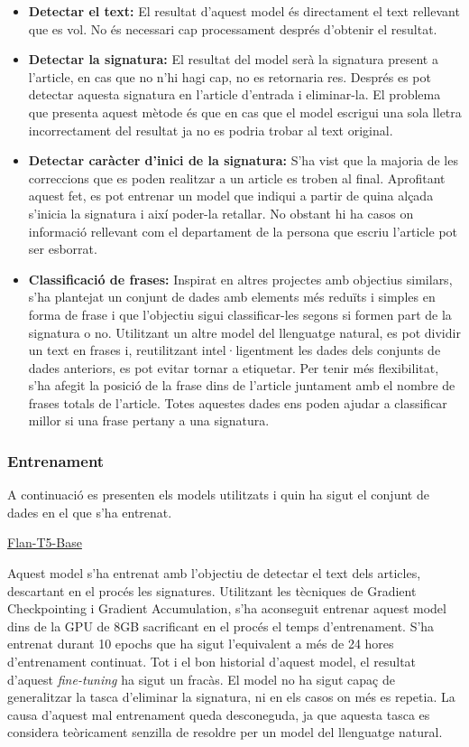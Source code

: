 \begin{itemize}
     \item \textbf{Detectar el text:} El resultat d'aquest model és directament el text rellevant que es vol. No és necessari cap processament després d'obtenir el resultat.
     \item \textbf{Detectar la signatura:} El resultat del model serà la signatura present a l'article, en cas que no n'hi hagi cap, no es retornaria res. Després es pot detectar aquesta signatura en l'article d'entrada i eliminar-la. El problema que presenta aquest mètode és que en cas que el model escrigui una sola lletra incorrectament del resultat ja no es podria trobar al text original.
     \item \textbf{Detectar caràcter d'inici de la signatura:} S'ha vist que la majoria de les correccions que es poden realitzar a un article es troben al final. Aprofitant aquest fet, es pot entrenar un model que indiqui a partir de quina alçada s'inicia la signatura i així poder-la retallar. No obstant hi ha casos on informació rellevant com el departament de la persona que escriu l'article pot ser esborrat.
     \item \textbf{Classificació de frases:} Inspirat en altres projectes amb objectius similars, s'ha plantejat un conjunt de dades amb elements més reduïts i simples en forma de frase i que l'objectiu sigui classificar-les segons si formen part de la signatura o no. Utilitzant un altre model del llenguatge natural, es pot dividir un text en frases i, reutilitzant intel·ligentment les dades dels conjunts de dades anteriors, es pot evitar tornar a etiquetar. Per tenir més flexibilitat, s'ha afegit la posició de la frase dins de l'article juntament amb el nombre de frases totals de l'article. Totes aquestes dades ens poden ajudar a classificar millor si una frase pertany a una signatura.
\end{itemize}

\subsubsection{Entrenament}
A continuació es presenten els models utilitzats i quin ha sigut el conjunt de dades en el que s'ha entrenat.

\underline{Flan-T5-Base}

Aquest model s'ha entrenat amb l'objectiu de detectar el text dels articles, descartant en el procés les signatures. Utilitzant les tècniques de Gradient Checkpointing i Gradient Accumulation, s'ha aconseguit entrenar aquest model dins de la GPU de 8GB sacrificant en el procés el temps d'entrenament. S'ha entrenat durant 10 epochs que ha sigut l'equivalent a més de 24 hores d'entrenament continuat.
Tot i el bon historial d'aquest model, el resultat d'aquest \textit{fine-tuning} ha sigut un fracàs. El model no ha sigut capaç de generalitzar la tasca d'eliminar la signatura, ni en els casos on més es repetia. La causa d'aquest mal entrenament queda desconeguda, ja que aquesta tasca es considera teòricament senzilla de resoldre per un model del llenguatge natural.

